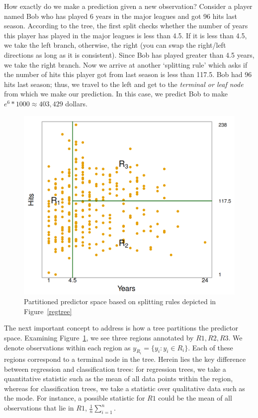 \documentclass[10pt,a4paper]{article}
\begin{document}
How exactly do we make a prediction given a new observation? Consider a player named Bob who has played 6 years in the major leagues and got 96 hits last season. According to the tree, the first split checks whether the number of years this player has played in the major leagues is less than 4.5. If it is less than 4.5, we take the left branch, otherwise, the right (you can swap the right/left directions as long as it is consistent). Since Bob has played greater than 4.5 years, we take the right branch. Now we arrive at another `splitting rule' which asks if the number of hits this player got from last season is less than 117.5. Bob had 96 hits last season; thus, we travel to the left and get to the \textit{terminal or leaf node} from which we make our prediction. In this case, we predict Bob to make $e^6*1000 \approx 403,429$ dollars.

\begin{figure}[H]
\centering
\includegraphics[scale=.45]{predictor_space.png}
\caption{Partitioned predictor space based on splitting rules depicted in Figure~\ref{regtree}}
\label{predspace}
\end{figure}

The next important concept to address is how a tree partitions the predictor space. Examining Figure~\ref{predspace}, we see three regions annotated by $R1, R2, R3$. We denote observations within each region as $y_{R_i}=\{y_i : y_i \in R_i\}$. Each of these regions correspond to a terminal node in the tree. Herein lies the key difference between regression and classification trees: for regression trees, we take a quantitative statistic such as the mean of all data points within the region, whereas for classification trees, we take a statistic over qualitative data such as the mode. For instance, a possible statistic for $R1$ could be the mean of all observations that lie in $R1$, $\frac{1}{n}\sum_{i=1}^n$.
\end{document}
